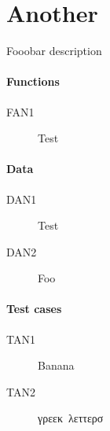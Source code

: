 \documentclass[a4paper, 11pt, pdftex, fleqn, review]{article}
\begin{document}
		
		\section{Another}

		Fooobar description

		\paragraph{Functions}
		\begin{description}
		
			\item[FAN1] Test
		\end{description}

		\paragraph{Data}
		\begin{description}
		
			\item[DAN1] Test
			\item[DAN2] Foo
		\end{description}

		\paragraph{Test cases}
		\begin{description}
		
			\item[TAN1] Banana
			\item[TAN2] γρεεκ λεττερσ
		\end{description}

		
		
\end{document}
